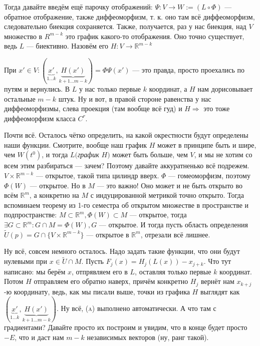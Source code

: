 \documentclass{article}
\begin{document}
Тогда давайте введём ещё парочку отображений: $\Psi: V \rightarrow W := (L \circ \Phi)$ --- обратное отображение, также диффеоморфизм, т. к. оно там всё диффеоморфизм, следовательно биекция сохраняется. Также, получается, раз у нас биекция, над $V$ множество в $R^{m - k}$ это график какого-то отображения. Оно точно существует, ведь $L$ --- биективно. Назовём его $H: V \rightarrow \mathbb{R}^{m - k}$

При $x' \in V: (\underbrace{x'}_{1 \ldots k}, \underbrace{H(x')}_{k + 1 \ldots m - k}) = \Phi\Psi(x')$ --- это правда, просто проехались по путям и вернулись. В $L$ у нас только первые $k$ координат, а $H$ нам дорисовывает остальные $m - k$ штук. Ну и вот, в правой стороне равенства у нас диффеоморфизмы, слева проекция (там вообще всё гуд) и $H \Rightarrow$ это тоже диффеоморфизм класса $C^r$. 

Почти всё. Осталось чётко определить, на какой окрестности будут определены наши функции. Смотрите, вообще наш график $H$ может в принципе быть и шире, чем $W(t^0)$, и тогда $L($\textit{график} $H)$ может быть больше, чем $V$, и мы не хотим со всем этим разбираться --- зачем? Поэтому давайте аккуратненько всё подрежем. $V \times \mathbb{R}^{m - k}$ --- открытое, такой типа цилиндр вверх. $\Phi$ --- гомеоморфизм, поэтому $\Phi(W)$ --- открытое. Но в $M$ --- это важно! Оно может и не быть открыто во всём $\mathbb{R}^m$, а конкретно на $M$ с индуцированной метрикой точно открыто. Тогда вспоминаем теорему из 1-го семестра об открытом множестве в пространстве и подпространстве: $M \subset \mathbb{R}^m, \Phi(W) \subset M$ --- открытое, тогда $\exists G \subset \mathbb{R}^m: G \cap M = \Phi(W), G$ --- открытое. И тогда пусть область определения $\widetilde{U}(p) = G \cap \{V \times \mathbb{R}^{m - k}\}$ --- открытое в $\mathbb{R}^m$, отрезали всё лишнее. 

Ну всё, совсем немного осталось. Надо задать такие функции, что они будут нулевыми при $x \in \widetilde{U} \cap M$. Пусть $F_j(x) = H_j(L(x)) - x_{j + k}$. Что тут написано: мы берём $x$, отпрявляем его в $L$, оставляя только первые $k$ координат. Потом $H$ отправляем его обратно наверх, причём конкретно $H_j$ вернёт нам $x_{k + j}$-ю координату, ведь, как мы писали выше, точки из графика $H$ выглядят как $(\underbrace{x'}_{1 \ldots k}, \underbrace{H(x')}_{k + 1 \ldots m - k})$. Ну всё, \textsc{(a)} выполнено автоматически. А что там с градиентами? Давайте просто их построим и увидим, что в конце будет просто $-E$, что и даст нам $m - k$ независимых векторов (ну, ранг такой).
\end{document}
